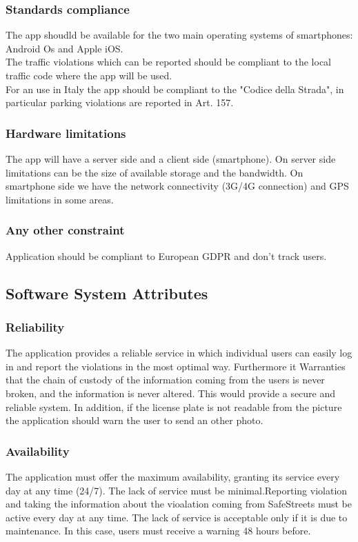 \subsubsection{Standards compliance}
The app shoudld be available for the two main operating systems of smartphones: Android Os and Apple iOS.\\
The traffic violations which can be reported should be compliant to the local traffic code where the app will be used.\\
For an use in Italy the app should be compliant to the "Codice della Strada", in particular parking violations are reported in Art. 157.\\


\subsubsection{Hardware limitations}
The app will have a server side and a client side (smartphone).
On server side limitations can be the size of available storage and the bandwidth.
On smartphone side we have the network connectivity (3G/4G connection) and GPS limitations in some areas.

\subsubsection{Any other constraint}
Application should be compliant to European GDPR and don't track users.

\subsection{Software System Attributes} %
\subsubsection{Reliability}
The application provides a reliable service in which individual users can easily log in and report the violations in the most optimal way. Furthermore it Warranties that the chain of custody of the information coming from the users is never broken, and the information is never altered. This would provide a secure and reliable system. In addition, if the license plate	is not readable from the picture the application should warn the user to send an other photo.
\subsubsection{Availability}
The application must offer the maximum availability, granting its service every day at any time (24/7). The lack of service must be minimal.Reporting violation and taking the information about the vioalation coming from SafeStreets must be active every day at any time. The lack of service is acceptable only if it is due to maintenance. In this case, users must receive a warning 48 hours before.
